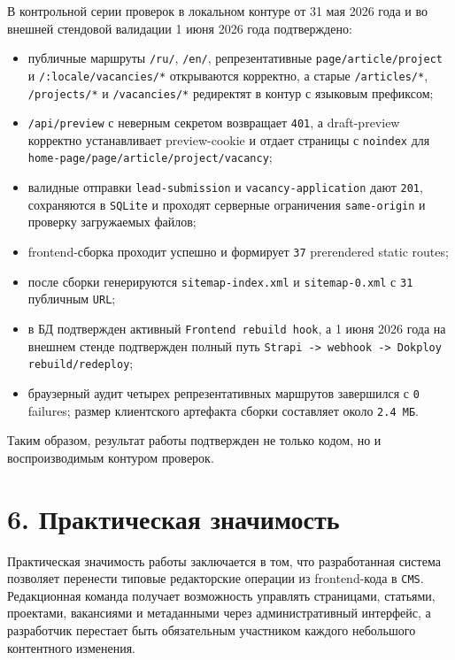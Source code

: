 \documentclass[12pt,a4paper]{article}
\begin{document}
В контрольной серии проверок в локальном контуре от 31 мая 2026 года и во внешней
стендовой валидации 1 июня 2026 года подтверждено:
\begin{itemize}
  \item публичные маршруты \texttt{/ru/}, \texttt{/en/}, репрезентативные
  \texttt{page/article/project} и \texttt{/:locale/vacancies/*} открываются корректно, а
  старые \texttt{/articles/*}, \texttt{/projects/*} и \texttt{/vacancies/*} редиректят в
  контур с языковым префиксом;
  \item \texttt{/api/preview} с неверным секретом возвращает \texttt{401}, а draft-preview
  корректно устанавливает preview-cookie и отдает страницы с \texttt{noindex} для
  \texttt{home-page/page/article/project/vacancy};
  \item валидные отправки \texttt{lead-submission} и \texttt{vacancy-application} дают
  \texttt{201}, сохраняются в \texttt{SQLite} и проходят серверные ограничения
  \texttt{same-origin} и проверку загружаемых файлов;
  \item frontend-сборка проходит успешно и формирует \texttt{37} prerendered static routes;
  \item после сборки генерируются \texttt{sitemap-index.xml} и \texttt{sitemap-0.xml} с
  \texttt{31} публичным \texttt{URL};
  \item в БД подтвержден активный \texttt{Frontend rebuild hook}, а 1 июня 2026 года на
  внешнем стенде подтвержден полный путь \texttt{Strapi -> webhook -> Dokploy rebuild/redeploy};
  \item браузерный аудит четырех репрезентативных маршрутов завершился с
  \texttt{0} failures; размер клиентского артефакта сборки составляет около \texttt{2.4 МБ}.
\end{itemize}

Таким образом, результат работы подтвержден не только кодом, но и воспроизводимым
контуром проверок.

\section*{6. Практическая значимость}

Практическая значимость работы заключается в том, что разработанная система позволяет
перенести типовые редакторские операции из frontend-кода в \texttt{CMS}. Редакционная
команда получает возможность управлять страницами, статьями, проектами, вакансиями и
метаданными через административный интерфейс, а разработчик перестает быть обязательным
участником каждого небольшого контентного изменения.
\end{document}

